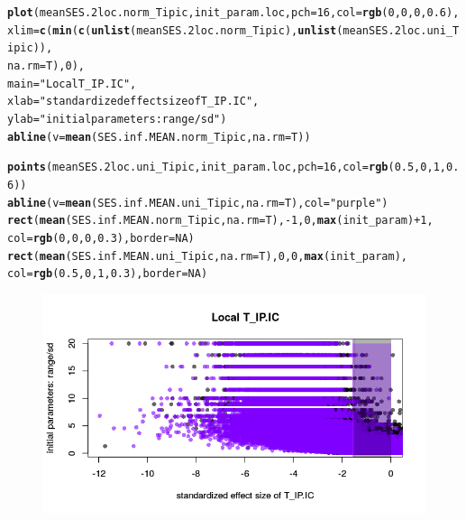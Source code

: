 \documentclass[12pt]{article}\usepackage[]{graphicx}\usepackage[]{color}
\makeatletter
\def\maxwidth{ %
  \ifdim\Gin@nat@width>\linewidth
    \linewidth
  \else
    \Gin@nat@width
  \fi
}
\newcommand{\hlnum}[1]{\textcolor[rgb]{0.686,0.059,0.569}{#1}}%
\newcommand{\hlstr}[1]{\textcolor[rgb]{0.192,0.494,0.8}{#1}}%
\newcommand{\hlopt}[1]{\textcolor[rgb]{0,0,0}{#1}}%
\newcommand{\hlstd}[1]{\textcolor[rgb]{0.345,0.345,0.345}{#1}}%
\newcommand{\hlkwc}[1]{\textcolor[rgb]{0.333,0.667,0.333}{#1}}%
\newcommand{\hlkwd}[1]{\textcolor[rgb]{0.737,0.353,0.396}{\textbf{#1}}}%
\newenvironment{kframe}{%
 \def\at@end@of@kframe{}%
 \ifinner\ifhmode%
  \def\at@end@of@kframe{\end{minipage}}%
  \begin{minipage}{\columnwidth}%
 \fi\fi%
 \def\FrameCommand##1{\hskip\@totalleftmargin \hskip-\fboxsep
 \colorbox{shadecolor}{##1}\hskip-\fboxsep
     \hskip-\linewidth \hskip-\@totalleftmargin \hskip\columnwidth}%
 \MakeFramed {\advance\hsize-\width
   \@totalleftmargin\z@ \linewidth\hsize
   \@setminipage}}%
 {\par\unskip\endMakeFramed%
 \at@end@of@kframe}
\newenvironment{knitrout}{}{} %
\makeatother
\begin{document}
\begin{landscape}
\begin{knitrout}
\begin{kframe}
\begin{alltt}
\hlkwd{plot}\hlstd{(meanSES.2loc.norm_Tipic, init_param.loc,} \hlkwc{pch} \hlstd{=} \hlnum{16}\hlstd{,} \hlkwc{col} \hlstd{=} \hlkwd{rgb}\hlstd{(}\hlnum{0}\hlstd{,} \hlnum{0}\hlstd{,} \hlnum{0}\hlstd{,} \hlnum{0.6}\hlstd{),}
     \hlkwc{xlim} \hlstd{=} \hlkwd{c}\hlstd{(}\hlkwd{min}\hlstd{(}\hlkwd{c}\hlstd{(}\hlkwd{unlist}\hlstd{(meanSES.2loc.norm_Tipic),} \hlkwd{unlist}\hlstd{(meanSES.2loc.uni_Tipic)),}
     \hlkwc{na.rm} \hlstd{= T),} \hlnum{0}\hlstd{),}
     \hlkwc{main} \hlstd{=} \hlstr{"Local T_IP.IC"}\hlstd{,}
     \hlkwc{xlab} \hlstd{=} \hlstr{"standardized effect size of T_IP.IC"}\hlstd{,}
     \hlkwc{ylab} \hlstd{=} \hlstr{"initial parameters: range/sd"}\hlstd{)}
\hlkwd{abline}\hlstd{(}\hlkwc{v} \hlstd{=} \hlkwd{mean}\hlstd{(SES.inf.MEAN.norm_Tipic,} \hlkwc{na.rm} \hlstd{= T))}

\hlkwd{points}\hlstd{(meanSES.2loc.uni_Tipic, init_param.loc,} \hlkwc{pch} \hlstd{=} \hlnum{16}\hlstd{,} \hlkwc{col} \hlstd{=} \hlkwd{rgb}\hlstd{(}\hlnum{0.5}\hlstd{,} \hlnum{0}\hlstd{,} \hlnum{1}\hlstd{,} \hlnum{0.6}\hlstd{))}
\hlkwd{abline}\hlstd{(}\hlkwc{v} \hlstd{=} \hlkwd{mean}\hlstd{(SES.inf.MEAN.uni_Tipic,} \hlkwc{na.rm} \hlstd{= T),} \hlkwc{col} \hlstd{=} \hlstr{"purple"}\hlstd{)}
\hlkwd{rect}\hlstd{(}\hlkwd{mean}\hlstd{(SES.inf.MEAN.norm_Tipic,} \hlkwc{na.rm} \hlstd{= T),} \hlopt{-}\hlnum{1}\hlstd{,} \hlnum{0}\hlstd{,} \hlkwd{max}\hlstd{(init_param)} \hlopt{+} \hlnum{1}\hlstd{,}
     \hlkwc{col} \hlstd{=} \hlkwd{rgb}\hlstd{(}\hlnum{0}\hlstd{,} \hlnum{0}\hlstd{,} \hlnum{0}\hlstd{,} \hlnum{0.3}\hlstd{),} \hlkwc{border} \hlstd{=} \hlnum{NA}\hlstd{)}
\hlkwd{rect}\hlstd{(}\hlkwd{mean}\hlstd{(SES.inf.MEAN.uni_Tipic,} \hlkwc{na.rm} \hlstd{= T),} \hlnum{0}\hlstd{,} \hlnum{0}\hlstd{,} \hlkwd{max}\hlstd{(init_param),}
     \hlkwc{col} \hlstd{=} \hlkwd{rgb}\hlstd{(}\hlnum{0.5}\hlstd{,} \hlnum{0}\hlstd{,} \hlnum{1}\hlstd{,} \hlnum{0.3}\hlstd{),} \hlkwc{border} \hlstd{=} \hlnum{NA}\hlstd{)}
\end{alltt}
\end{kframe}\begin{figure}

{\centering \includegraphics[width=\maxwidth]{figure/In_filter_results_plot_initparam-1} 

}
\end{figure}
\end{knitrout}
\end{landscape}
\end{document}
